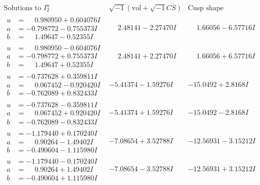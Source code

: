\documentclass[1p]{elsarticle_modified}
\theoremstyle{definition}
\newcommand{\I}{\sqrt{-1}}
\begin{document}
$$\begin{array}{c|c|c}  
\text{Solutions to }I^u_{2}& \I (\text{vol} + \sqrt{-1}CS) & \text{Cusp shape}\\
 \hline 
\begin{aligned}
u &= \phantom{-}0.980950 + 0.604076 I \\
a &= -0.798772 - 0.755373 I \\
b &= \phantom{-}1.49647 - 0.52355 I\end{aligned}
 & \phantom{-}2.48141 - 2.27470 I & \phantom{-}1.66056 - 6.57716 I \\ \hline\begin{aligned}
u &= \phantom{-}0.980950 - 0.604076 I \\
a &= -0.798772 + 0.755373 I \\
b &= \phantom{-}1.49647 + 0.52355 I\end{aligned}
 & \phantom{-}2.48141 + 2.27470 I & \phantom{-}1.66056 + 6.57716 I \\ \hline\begin{aligned}
u &= -0.737628 + 0.359811 I \\
a &= \phantom{-}0.067452 - 0.920420 I \\
b &= -0.762089 + 0.832433 I\end{aligned}
 & -5.41374 - 1.59276 I & -15.0492 + 2.8168 I \\ \hline\begin{aligned}
u &= -0.737628 - 0.359811 I \\
a &= \phantom{-}0.067452 + 0.920420 I \\
b &= -0.762089 - 0.832433 I\end{aligned}
 & -5.41374 + 1.59276 I & -15.0492 - 2.8168 I \\ \hline\begin{aligned}
u &= -1.179440 + 0.170240 I \\
a &= \phantom{-}0.90264 - 1.49402 I \\
b &= -0.490604 - 1.115980 I\end{aligned}
 & -7.08654 + 3.52788 I & -12.56931 - 3.15212 I \\ \hline\begin{aligned}
u &= -1.179440 - 0.170240 I \\
a &= \phantom{-}0.90264 + 1.49402 I \\
b &= -0.490604 + 1.115980 I\end{aligned}
 & -7.08654 - 3.52788 I & -12.56931 + 3.15212 I \\ \hline\begin{aligned}

\end{aligned}
\end{array}$$
\end{document}
